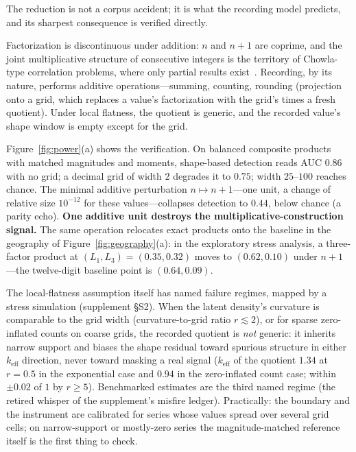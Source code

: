 \documentclass[12pt]{article}
\newcommand{\keff}{k_{\mathrm{eff}}}
\begin{document}
The reduction is not a corpus accident; it is what the recording model
predicts, and its sharpest consequence is verified directly.

Factorization is discontinuous under addition: $n$ and $n+1$ are coprime, and
the joint multiplicative structure of consecutive integers is the territory of
Chowla-type correlation problems, where only partial results
exist~\citep{taoteravainen2019}. Recording, by its nature, performs additive
operations---summing, counting, rounding (projection onto a grid, which
replaces a value's factorization with the grid's times a fresh quotient).
Under local flatness, the quotient is generic, and the recorded value's shape
window is empty except for the grid.

Figure~\ref{fig:power}(a) shows the verification. On balanced composite
products with matched magnitudes and moments, shape-based detection reads AUC
$0.86$ with no grid; a decimal grid of width $2$ degrades it to $0.75$; width
$25$--$100$ reaches chance. The minimal additive perturbation
$n \mapsto n{+}1$---one unit, a change of relative size $10^{-12}$ for these
values---collapses detection to $0.44$, below chance (a parity echo).
\textbf{One additive unit destroys the multiplicative-construction signal.}
The same operation relocates exact products onto the baseline in the geography
of Figure~\ref{fig:geography}(a): in the exploratory stress analysis, a
three-factor product at $(L_1, L_3) = (0.35, 0.32)$ moves to $(0.62, 0.10)$
under $n{+}1$---the twelve-digit baseline point is $(0.64, 0.09)$.

The local-flatness assumption itself has named failure regimes, mapped by a
stress simulation (supplement \S S2). When the latent density's curvature is
comparable to the grid width (curvature-to-grid ratio $r \lesssim 2$), or for
sparse zero-inflated counts on coarse grids, the recorded quotient is
\emph{not} generic: it inherits narrow support and biases the shape residual
toward spurious structure in either $\keff$ direction, never toward masking
a real signal ($\keff$ of the quotient $1.34$ at $r = 0.5$ in the
exponential case and $0.94$ in the zero-inflated count case; within
$\pm 0.02$ of $1$ by $r \ge 5$). Benchmarked estimates are the third named regime (the
retired whisper of the supplement's misfire ledger). Practically: the
boundary and the instrument are calibrated for series whose values spread
over several grid cells; on narrow-support or mostly-zero series the
magnitude-matched reference itself is the first thing to check.
\end{document}
